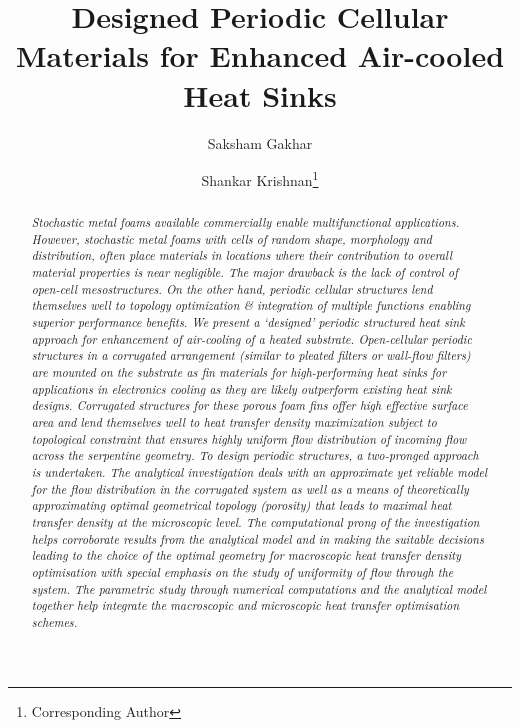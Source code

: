 \documentclass[twocolumn,10pt,cleanfoot]{ihmtc}
\title{Designed Periodic Cellular Materials for Enhanced Air-cooled Heat Sinks}
\author{Saksham Gakhar
\affiliation{Indian Institute of Technology Bombay\\saksham.gakhar94@gmail.com}
   
    }
\author{Shankar Krishnan\thanks{Corresponding Author}
\affiliation{Professor, Indian Institute of Technology Bombay\\kshankar@iitb.ac.in}
   
    }
\begin{document}
\maketitle 

\begin{abstract}
{\it \small
Stochastic metal foams available commercially enable multifunctional applications. However, stochastic metal foams with cells of random shape, morphology and distribution, often place materials in locations where their contribution to overall material properties is near negligible. The major drawback is the lack of control of open-cell mesostructures. On the other hand, periodic cellular structures lend themselves well to topology optimization \& integration of multiple functions enabling superior performance benefits. We present a `designed' periodic structured heat sink approach for enhancement of air-cooling of a heated substrate. Open-cellular periodic structures in a corrugated arrangement (similar to pleated filters or wall-flow filters) are mounted on the substrate as fin materials for high-performing heat sinks for applications in electronics cooling as they are likely outperform existing heat sink designs. Corrugated structures for these porous foam fins offer high effective surface area and lend themselves well to heat transfer density maximization subject to topological constraint that ensures highly uniform flow distribution of incoming flow across the serpentine geometry. To design periodic structures, a two-pronged approach is undertaken. The analytical investigation deals with an approximate yet reliable model for the flow distribution in the corrugated system as well as a means of theoretically approximating optimal geometrical topology (porosity) that leads to maximal heat transfer density at the microscopic level. The computational prong of the investigation helps corroborate results from the analytical model and in making the suitable decisions leading to the choice of the optimal geometry for macroscopic heat transfer density optimisation with special emphasis on the study of uniformity of flow through the system. The parametric study through numerical computations and the analytical model together help integrate the macroscopic and microscopic heat transfer optimisation schemes.
}
\end{abstract}
\end{document}

